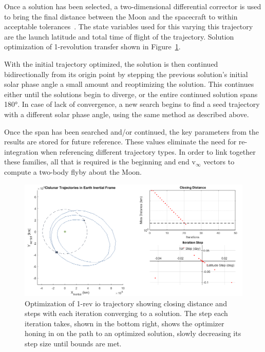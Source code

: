 \documentclass[letterpaper, paper,11pt]{AAS}	%
\begin{document}
Once a solution has been selected, a two-dimensional differential corrector is used to bring the final distance between the Moon and the spacecraft to within acceptable tolerances~\cite{Lantoine2014}. The state variables used for this varying this trajectory are the launch latitude and total time of flight of the trajectory. Solution optimization of 1-revolution transfer shown in Figure~\ref{fig:optimization}.

With the initial trajectory optimized, the solution is then continued bidirectionally from its origin point by stepping the previous solution’s initial solar phase angle a small amount and reoptimizing the solution. This continues either until the solutions begin to diverge, or the entire continued solution spans 180°. In case of lack of convergence, a new search begins to find a seed trajectory with a different solar phase angle, using the same method as described above.

Once the span has been searched and/or continued, the key parameters from the results are stored for future reference. These values eliminate the need for re-integration when referencing different trajectory types. In order to link together these families, all that is required is the beginning and end v\(_\infty\) vectors to compute a two-body flyby about the Moon.

\begin{figure}[h!]
    \centering
    \includegraphics[width=6in]{./etc/optimization.png}
    \caption{Optimization of 1-rev io trajectory showing closing distance and steps with each iteration converging to a solution. The step each iteration takes, shown in the bottom right, shows the optimizer honing in on the path to an optimized solution, slowly decreasing its step size until bounds are met.}
    \label{fig:optimization}
\end{figure} 
\end{document}
